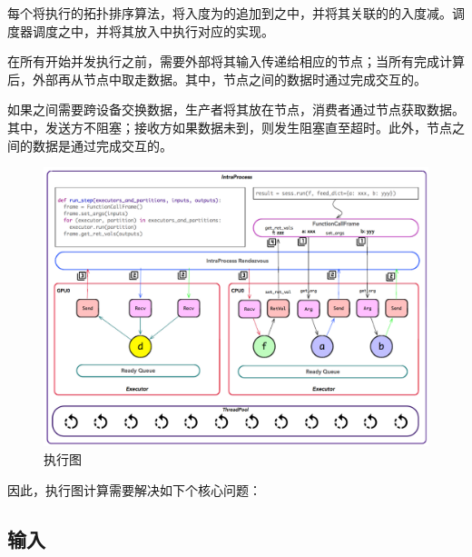 \begin{content}
每个将执行的拓扑排序算法，将入度为的追加到之中，并将其关联的的入度减。调度器调度之中，并将其放入中执行对应的实现。

在所有开始并发执行之前，需要外部将其输入传递给相应的节点；当所有完成计算后，外部再从节点中取走数据。其中，节点之间的数据时通过完成交互的。

如果之间需要跨设备交换数据，生产者将其放在节点，消费者通过节点获取数据。其中，发送方不阻塞；接收方如果数据未到，则发生阻塞直至超时。此外，节点之间的数据是通过完成交互的。

\begin{figure}[H]
\centering
\includegraphics[width=1.0\textwidth]{figures/local-graph-execution.png}
\caption{执行图}
 \label{fig:local-graph-execution}
\end{figure}

因此，执行图计算需要解决如下个核心问题：

\begin{enum}
\end{enum}

\subsection{输入}


\end{content}
